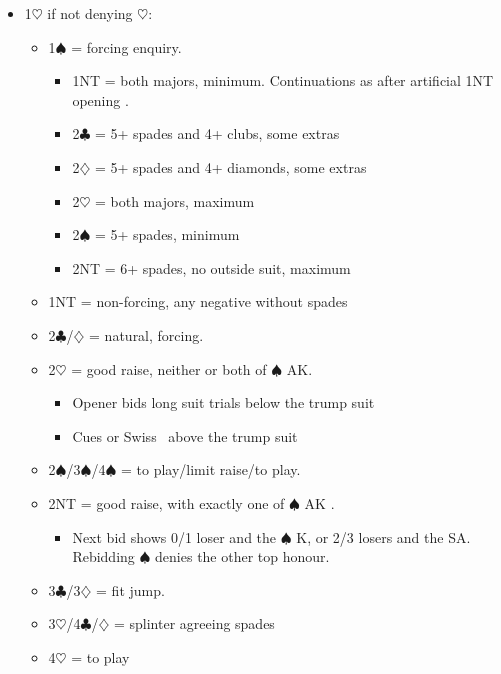 \documentclass[a4paper,14pt]{extarticle}
\begin{document}
\begin{itemize}
\item 1$\heartsuit$ if not denying $\heartsuit$:
	\begin{itemize}
   \item 1$\spadesuit$ = forcing enquiry.
		\begin{itemize}
      \item 1NT = both majors, minimum. Continuations as after artificial 1NT opening .
      \item 2$\clubsuit$ = 5+ spades and 4+ clubs, some extras
      \item 2$\diamondsuit$ = 5+ spades and 4+ diamonds, some extras
      \item 2$\heartsuit$ = both majors, maximum
		\item 2$\spadesuit$ = 5+ spades, minimum
		\item 2NT = 6+ spades, no outside suit, maximum
		\end{itemize}
   \item 1NT = non-forcing, any negative without spades
   \item 2$\clubsuit$/$\diamondsuit$ = natural, forcing.
   \item 2$\heartsuit$ = good raise, neither or both of $\spadesuit$ AK.
		\begin{itemize}
		\item Opener bids long suit trials below the trump suit
		\item Cues or Swiss~ above the trump suit
		\end{itemize}
   \item 2$\spadesuit$/3$\spadesuit$/4$\spadesuit$ = to play/limit raise/to play.
   \item 2NT = good raise, with exactly one of $\spadesuit$ AK .
		\begin{itemize}
      \item Next bid shows 0/1 loser and the $\spadesuit$ K, or 2/3 losers and the SA.
         Rebidding $\spadesuit$ denies the other top honour.
		\end{itemize}
   \item 3$\clubsuit$/3$\diamondsuit$ = fit jump.
   \item 3$\heartsuit$/4$\clubsuit$/$\diamondsuit$ = splinter agreeing spades
	\item 4$\heartsuit$ = to play
	\end{itemize}



\end{itemize}
\end{document}
